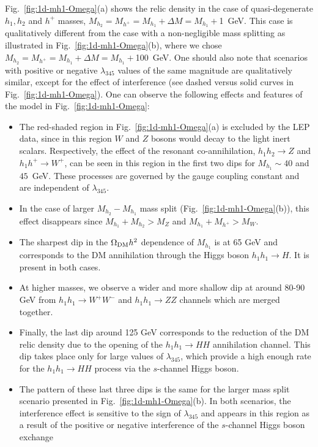 \documentclass[12pt,a4paper]{article}
\begin{document}
Fig.~\ref{fig:1d-mh1-Omega}(a) shows the relic density in the case of quasi-degenerate $h_1,h_2$ and $h^+$ masses, 
$M_{h_2}=M_{h^+}=M_{h_1}+\Delta M= M_{h_1}+$1~GeV.
This case is qualitatively different from the case with a non-negligible mass splitting
as illustrated in Fig.~\ref{fig:1d-mh1-Omega}(b), where we chose  $M_{h_2}=M_{h^+}=M_{h_1}+\Delta M=M_{h_1}+$100~GeV.
One should also note that scenarios with positive or negative $\lambda_{345}$ values of the same magnitude
are qualitatively similar, except for the effect of interference (see dashed versus solid curves in Fig.~\ref{fig:1d-mh1-Omega}). 
One can observe the following effects and features of the model in Fig.~\ref{fig:1d-mh1-Omega}:
\begin{itemize}
\item The red-shaded region in Fig.~\ref{fig:1d-mh1-Omega}(a) 
is excluded by the LEP data, since in this region $W$ and $Z$ bosons would decay to the light inert scalars. 
Respectively, the effect of the resonant co-annihilation, $h_1 h_2 \to Z$ and $h_1 h^+ \to W^+$, can be seen 
in this region in the first two dips for $M_{h_1} \sim 40$ and $45$~GeV.
These processes are governed by the gauge coupling constant and are independent of $\lambda_{345}$. 
\item
In the case of larger $M_{h_2}-M_{h_1}$  mass split (Fig.~\ref{fig:1d-mh1-Omega}(b)), 
this effect disappears since $M_{h_1}+M_{h_2} > M_Z$ and $M_{h_1}+M_{h^+} > M_W$.
\item
The sharpest dip in the $\Omega_{\rm DM} h^2$ dependence of $M_{h_1}$ is at 65 GeV and 
corresponds to the DM annihilation through the Higgs boson $h_1 h_1 \to H$. It is present in both cases. 
\item
At higher masses, we observe a wider and more shallow  dip at around 80-90 GeV from  $h_1
h_1\to W^+W^-$ and $h_1 h_1\to ZZ$ channels which are merged together. 
\item
Finally, the last dip around 125 GeV corresponds to the
reduction of the DM relic density  due to the opening of the $ h_1 h_1\to HH$ annihilation channel. This dip takes place only for 
large values of $\lambda_{345}$, which provide a high enough rate for the $h_1h_1\to HH$ process via the $s$-channel Higgs boson. 
\item
The pattern of these last three dips is the same for the larger mass split scenario presented in Fig.~\ref{fig:1d-mh1-Omega}(b). 
In both scenarios, the interference effect is sensitive to the sign of $\lambda_{345}$ and appears in this region 
as a result of the positive or negative interference of the $s$-channel Higgs boson exchange

\end{itemize}
\end{document}
